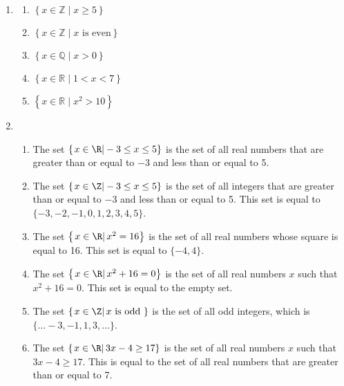 \begin{enumerate}
\item \begin{multicols}{2}
\begin{enumerate}
\item $\left\{ x\in \mathbb{Z} \mid x \geq 5 \right\}$
\item $\left\{ x\in \mathbb{Z} \mid x \text{ is even} \right\}$
\item $\left\{ x\in \mathbb{Q} \mid x > 0 \right\}$
\item $\left\{ x\in \mathbb{R} \mid  1 < x < 7 \right\}$
\item $\left\{ x\in \mathbb{R} \mid x^2 > 10 \right\}$
\end{enumerate}
\end{multicols}


\item \begin{enumerate}
\item The set $\left\{ \left. x \in \R \right| -3 \leq x \leq 5 \right\}$ is the set of all real numbers that are greater than or equal to $-3$ and less than or equal to 5.

\item The set $\left\{ \left. x \in \Z \right| -3 \leq x \leq 5 \right\}$ is the set of all integers that are greater than or equal to $-3$ and less than or equal to 5.  This set is equal to $\{ -3, -2, -1, 0, 1, 2, 3, 4, 5 \}$.

\item The set $\left\{ \left. x \in \R \right| x^2 = 16 \right\}$ is the set of all real numbers whose square is equal to 16.  This set is equal to $\{-4, 4\}$.

\item The set $\left\{ \left. x \in \R \right| x^2 + 16 = 0 \right\}$ is the set of all real numbers $x$ such that $x^2 + 16 = 0$.  This set is equal to the empty set.

\item The set $\left\{ \left. x \in \Z \right| x \text{ is odd } \right\}$ is the set of all odd integers, which is \\$\{ \ldots -3, -1,  1, 3, \ldots \}$.

\item The set $\left\{ \left. x \in \R \right| 3x - 4 \geq 17 \right\}$ is the set of all real numbers $x$ such that $3x - 4 \geq 17$.  This is equal to the set of all real numbers that are greater than or equal to 7.
\end{enumerate}
\end{enumerate}


